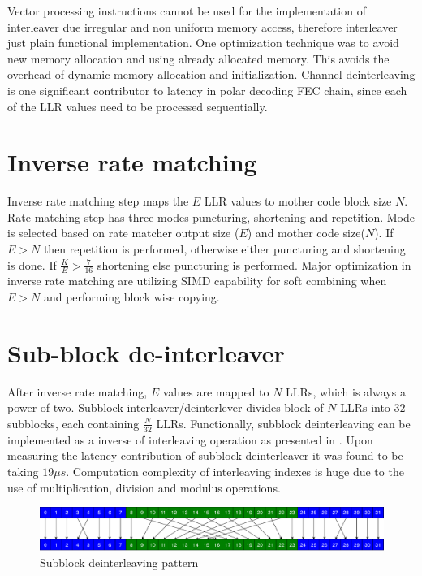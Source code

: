 Vector processing instructions cannot be used for the implementation of interleaver due irregular and non uniform memory access, therefore interleaver just plain functional implementation. One optimization technique was to avoid new memory allocation and using already allocated memory. This avoids the overhead of dynamic memory allocation and initialization. Channel deinterleaving is one significant contributor to latency in polar decoding FEC chain, since each of the LLR values need to be processed sequentially.

\section{Inverse rate matching}
Inverse rate matching step maps the $E$ LLR values to mother code block size $ N $. Rate matching step has three modes puncturing, shortening and repetition. Mode is selected based on rate matcher output size ($E$) and mother code size($ N $). If $E > N$ then repetition is performed, otherwise either puncturing and shortening is done. If $ \frac{K}{E} > \frac{7}{16} $ shortening else puncturing is performed. Major optimization in inverse rate matching are utilizing SIMD capability for soft combining when $ E>N $ and performing block wise copying.
%
%
\section{Sub-block de-interleaver}
After inverse rate matching, $E$ values are mapped to $N$ LLRs, which is always a power of two. Subblock interleaver/deinterlever divides block of $N$ LLRs into $32$ subblocks, each containing $\frac{N}{32}$ LLRs. Functionally, subblock deinterleaving can be implemented as a inverse of interleaving operation as presented in \cite{3gpp.38.212}. Upon measuring the latency contribution of subblock deinterleaver it was found to be taking $19 \mu s$. Computation complexity of interleaving indexes is huge due to the use of multiplication, division and modulus operations. \newline

\begin{figure}[]
	\centering
	\includegraphics[width=1.0\textwidth]{./figures/subblockDeinterleaver.pdf}
	\caption{Subblock deinterleaving pattern}
	\label{fig:subblockDeinterleaver}
\end{figure}

